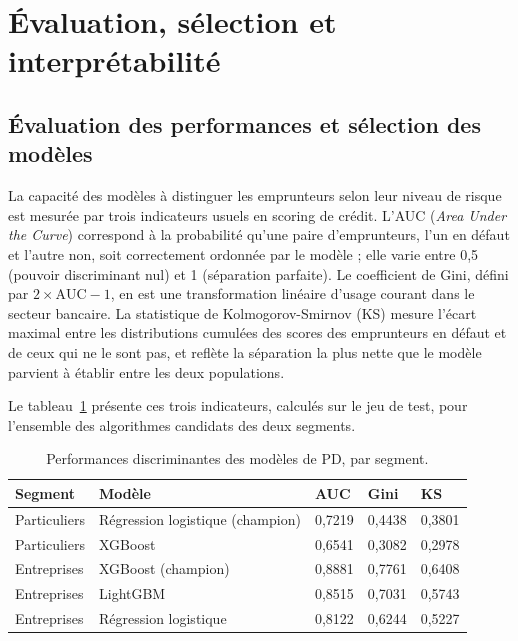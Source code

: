 \section{Évaluation, sélection et interprétabilité}

\subsection{Évaluation des performances et sélection des modèles}

La capacité des modèles à distinguer les emprunteurs selon leur niveau de risque est mesurée par trois indicateurs usuels en scoring de crédit. L'AUC (\emph{Area Under the Curve}) correspond à la probabilité qu'une paire d'emprunteurs, l'un en défaut et l'autre non, soit correctement ordonnée par le modèle ; elle varie entre 0,5 (pouvoir discriminant nul) et 1 (séparation parfaite). Le coefficient de Gini, défini par $2 \times \text{AUC} - 1$, en est une transformation linéaire d'usage courant dans le secteur bancaire. La statistique de Kolmogorov-Smirnov (KS) mesure l'écart maximal entre les distributions cumulées des scores des emprunteurs en défaut et de ceux qui ne le sont pas, et reflète la séparation la plus nette que le modèle parvient à établir entre les deux populations.

Le tableau~\ref{tab:performance-pd} présente ces trois indicateurs, calculés sur le jeu de test, pour l'ensemble des algorithmes candidats des deux segments.

\begin{table}[htbp]
    \centering
    \footnotesize
    \caption{Performances discriminantes des modèles de PD, par segment.}
    \label{tab:performance-pd}
    \begin{tabular}{p{2.4cm}p{4cm}p{1.8cm}p{1.8cm}p{1.8cm}}
        \toprule
        \textbf{Segment} & \textbf{Modèle} & \textbf{AUC} & \textbf{Gini} & \textbf{KS} \\
        \midrule
        Particuliers & Régression logistique (champion) & 0,7219 & 0,4438 & 0,3801 \\
        Particuliers & XGBoost & 0,6541 & 0,3082 & 0,2978 \\
        \addlinespace
        Entreprises & XGBoost (champion) & 0,8881 & 0,7761 & 0,6408 \\
        Entreprises & LightGBM & 0,8515 & 0,7031 & 0,5743 \\
        Entreprises & Régression logistique & 0,8122 & 0,6244 & 0,5227 \\
        \bottomrule
    \end{tabular}
\end{table}

